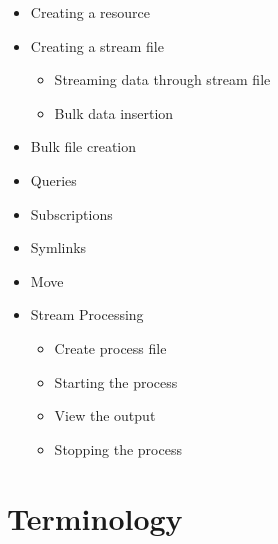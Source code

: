 \begin{itemize}
\item Creating a resource
\item Creating a stream file
	\begin{itemize}
	\item Streaming data through stream file
	\item Bulk data insertion
	\end{itemize}
\item Bulk file creation
\item Queries
\item Subscriptions
\item Symlinks
\item Move
\item Stream Processing
	\begin{itemize}
	\item Create process file
	\item Starting the process
	\item View the output
	\item Stopping the process
 	\end{itemize}
\end{itemize}	


\section{Terminology}

